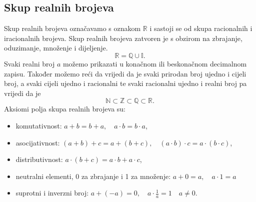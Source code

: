 \subsection{Skup realnih brojeva}\label{subsec:skup-realnih-brojeva}
Skup realnih brojeva označavamo s oznakom $\mathbb{R}$ i sastoji se od skupa racionalnih i iracionalnih brojeva.
Skup realnih brojeva zatvoren je s obzirom na zbrajanje, oduzimanje, množenje i dijeljenje.
\[ \mathbb{R}=\mathbb{Q} \cup \mathbb{I}. \]
Svaki realni broj $a$ možemo prikazati u konačnom ili beskonačnom decimalnom zapisu.
Također možemo reći da vrijedi da je svaki prirodan broj ujedno i cijeli broj, a svaki cijeli ujedno i racionalni te svaki racionalni ujedno i realni broj pa vrijedi da je
\[ \mathbb{N} \subset \mathbb{Z} \subset \mathbb{Q} \subset \mathbb{R}. \]
Aksiomi polja skupa realnih brojeva su:
\begin{itemize}
  \item komutativnost: $a+b=b+a, \quad a \cdot b = b \cdot a$,
  \item asocijativnost: $(a+b)+c=a+(b+c), \quad (a \cdot b) \cdot c = a \cdot (b \cdot c)$,
  \item distributivnost: $a \cdot (b + c) = a \cdot b + a \cdot c$,
  \item neutralni elementi, 0 za zbrajanje i 1 za množenje: $a + 0 = a, \quad a \cdot 1 = a$
  \item suprotni i inverzni broj: $\displaystyle a + (-a) = 0, \quad a \cdot \frac{1}{a} = 1 \quad a \neq 0.$
\end{itemize}
